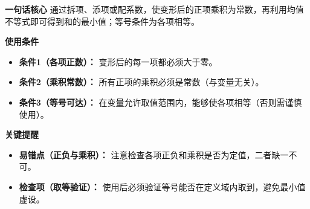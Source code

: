 \begin{summarybox}
	\textbf{\textcolor{CSummary}{一句话核心}}
	通过拆项、添项或配系数，使变形后的正项乘积为常数，再利用均值不等式即可得到和的最小值；等号条件为各项相等。

	\medskip
	\textbf{\textcolor{CSummary}{使用条件}}
	\begin{itemize}[leftmargin=*, itemsep=0.5em, topsep=0.4em]
		\item \textbf{条件1（各项正数）：} 变形后的每一项都必须大于零。
		\item \textbf{条件2（乘积常数）：} 所有正项的乘积必须是常数（与变量无关）。
		\item \textbf{条件3（等号可达）：} 在变量允许取值范围内，能够使各项相等（否则需谨慎使用）。
	\end{itemize}

	\medskip
	\textbf{\textcolor{CSummary}{关键提醒}}
	\begin{itemize}[leftmargin=*, itemsep=0.5em, topsep=0.4em]
		\item \textbf{易错点（正负与乘积）：} 注意检查各项正负和乘积是否为定值，二者缺一不可。
		\item \textbf{检查项（取等验证）：} 使用后必须验证等号能否在定义域内取到，避免最小值虚设。
	\end{itemize}

\end{summarybox}
